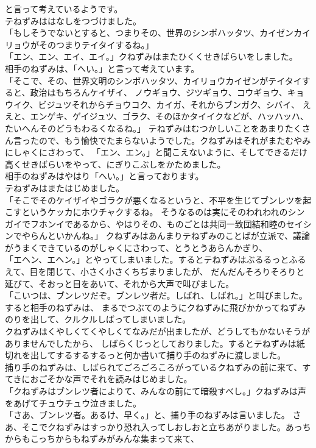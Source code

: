 \documentclass[
    a4paper,
    10pt,
    book]
    {tarticle}
\begin{document}
\newpage
\thispagestyle{fancy}
\fancyhead[R]{\empty}
と言って考えているようです。\\
\indent テねずみははなしをつづけました。\\
「もしそうでないとすると、つまりその、世界のシンポハッタツ、カイゼンカイリョウがそのつまりテイタイするね。」\\
「エン、エン、エイ、エイ。」クねずみはまたひくくせきばらいをしました。\\
\indent 相手のねずみは、「へい。」と言って考えています。\\
「そこで、その、世界文明のシンポハッタツ、カイリョウカイゼンがテイタイすると、政治はもちろんケイザイ、
ノウギョウ、ジツギョウ、コウギョウ、キョウイク、ビジュツそれからチョウコク、カイガ、それからブンガク、シバイ、
ええと、エンゲキ、ゲイジュツ、ゴラク、そのほかタイイクなどが、ハッハッハ、たいへんそのどうもわるくなるね。」
テねずみはむつかしいことをあまりたくさん言ったので、もう愉快でたまらないようでした。クねずみはそれがまたむやみにしゃくにさわって、
「エン、エン。」と聞こえないように、そしてできるだけ高くせきばらいをやって、にぎりこぶしをかためました。\\
\indent 相手のねずみはやはり「へい。」と言っております。\\
\indent テねずみはまたはじめました。\\
「そこでそのケイザイやゴラクが悪くなるというと、不平を生じてブンレツを起こすというケッカにホウチャクするね。
そうなるのは実にそのわれわれのシンガイでフホンイであるから、やはりその、ものごとは共同一致団結和睦のセイシンでやらんといかんね。」
\newpage
\thispagestyle{fancy}
\fancyhead[R]{\empty}
\indent クねずみはあんまりテねずみのことばが立派で、議論がうまくできているのがしゃくにさわって、とうとうあらんかぎり、\\
「エヘン、エヘン。」とやってしまいました。するとテねずみはぶるるっとふるえて、目を閉じて、小さく小さくちぢまりましたが、
だんだんそろりそろりと延びて、そおっと目をあいて、それから大声で叫びました。\\
「こいつは、ブンレツだぞ。ブンレツ者だ。しばれ、しばれ。」と叫びました。すると相手のねずみは、
まるでつぶてのようにクねずみに飛びかかってねずみのりを出して、クルクルしばってしまいました。\\
\indent クねずみはくやしくてくやしくてなみだが出ましたが、どうしてもかないそうがありませんでしたから、
しばらくじっとしておりました。するとテねずみは紙切れを出してするするするっと何か書いて捕り手のねずみに渡しました。\\
\indent 捕り手のねずみは、しばられてごろごろころがっているクねずみの前に来て、すてきにおごそかな声でそれを読みはじめました。\\
「クねずみはブンレツ者によりて、みんなの前にて暗殺すべし。」クねずみは声をあげてチュウチュウ泣きました。\\
「さあ、ブンレツ者。あるけ、早く。」と、捕り手のねずみは言いました。
さあ、そこでクねずみはすっかり恐れ入ってしおしおと立ちあがりました。あっちからもこっちからもねずみがみんな集まって来て、
\end{document}
